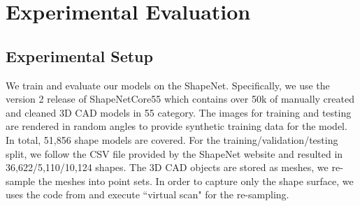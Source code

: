 \section{Experimental Evaluation}
\subsection{Experimental Setup}
We train and evaluate our models on the ShapeNet\cite{shapenetdata}. Specifically, we use the version 2 release of ShapeNetCore55 which contains over 50k of
manually created and cleaned 3D CAD models in 55 category.
The images for training
and testing are rendered in random angles to provide synthetic training data for the model. In total,
51,856 shape models are covered. For the training/validation/testing split, we follow the CSV file provided by the ShapeNet website and resulted in 36,622/5,110/10,124 shapes. The 3D CAD objects are
stored as meshes, we re-sample the meshes into point sets. In order to capture only the shape surface, we uses the code from \cite{Wang-2017-OCNN} and execute ``virtual scan" for the re-sampling.
